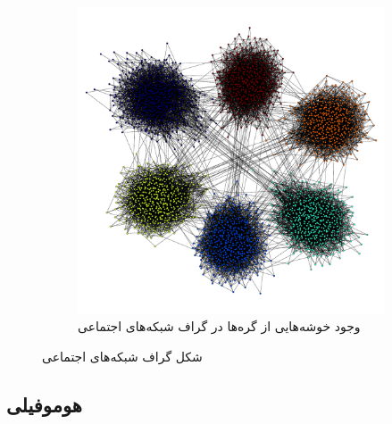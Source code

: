 \begin {persian}
\begin{figure}[H]
\begin{subfigure}[b]{0.4\textwidth}
 \end{subfigure}
 ~
 \begin{subfigure}[b]{0.58\textwidth}
 \includegraphics[width=\textwidth]{figures/GRAPHS/clusters}
 \caption{وجود خوشه‌ها‌یی از گره‌ها در گراف شبکه‌های اجتماعی}
 
 \end{subfigure}
 
 \caption[گراف شبکه‌های اجتماعی]{شکل گراف شبکه‌های اجتماعی}
\end{figure}
 
\end {persian}


\subsection{هوموفیلی}

